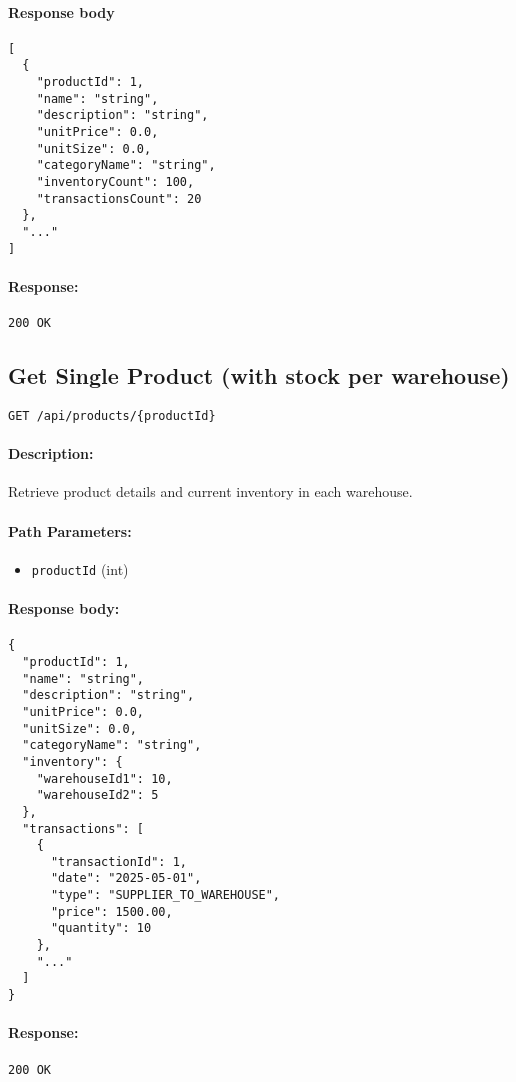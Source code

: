 \documentclass[a4paper,11pt]{article}
\begin{document}
\paragraph{Response body}
\begin{verbatim}
[
  {
    "productId": 1,
    "name": "string",
    "description": "string",
    "unitPrice": 0.0,
    "unitSize": 0.0,
    "categoryName": "string",
    "inventoryCount": 100,
    "transactionsCount": 20
  },
  "..."
]
\end{verbatim}
\paragraph{Response:} \texttt{200 OK}

\subsection{Get Single Product (with stock per warehouse)}
\label{sec:products-single}
\begin{verbatim}
GET /api/products/{productId}
\end{verbatim}
\paragraph{Description:} Retrieve product details and current inventory in each warehouse.
\paragraph{Path Parameters:}
\begin{itemize}
  \item \texttt{productId} (int)
\end{itemize}
\paragraph{Response body:}
\begin{verbatim}
{
  "productId": 1,
  "name": "string",
  "description": "string",
  "unitPrice": 0.0,
  "unitSize": 0.0,
  "categoryName": "string",
  "inventory": {
    "warehouseId1": 10,
    "warehouseId2": 5
  },
  "transactions": [
    {
      "transactionId": 1,
      "date": "2025-05-01",
      "type": "SUPPLIER_TO_WAREHOUSE",
      "price": 1500.00,
      "quantity": 10
    },
    "..."
  ]
}
\end{verbatim}
\paragraph{Response:} \texttt{200 OK}
\end{document}
